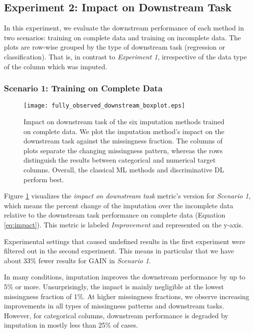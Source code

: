\subsection{Experiment 2: Impact on Downstream Task}

In this experiment, we evaluate the downstream performance of each method in two scenarios: training on complete data and training on incomplete data. The plots are row-wise grouped by the type of downstream task (regression or classification). That is, in contrast to \textit{Experiment 1}, irrespective of the data type of the column which was imputed. 


\subsubsection{Scenario 1: Training on Complete Data}

\begin{figure}\centering
	\texttt{[image: fully\_observed\_downstream\_boxplot.eps]}
	\caption[Downstream Ranks - Fully Observed]{Impact on downstream task of the six imputation methods trained on complete data. We plot the imputation method's impact on the downstream task against the missingness fraction. The columns of plots separate the changing missingness pattern, whereas the rows distinguish the results between categorical and numerical target columns. Overall, the classical ML methods and discriminative DL perform best.
    }
	\label{fig:fully_observed_downstream_boxplot}
\end{figure}

Figure \ref{fig:fully_observed_downstream_boxplot} visualizes the \textit{impact on downstream task} metric's version for \textit{Scenario 1}, which means the percent change of the imputation over the incomplete data relative to the downstream task performance on complete data (Equation \ref{eq:impact}). This metric is labeled \textit{Improvement} and represented on the y-axis.

Experimental settings that caused undefined results in the first experiment were filtered out in the second experiment. This means in particular that we have about 33\% fewer results for GAIN in \textit{Scenario 1}.

In many conditions, imputation improves the downstream performance by up to 5\% or more. Unsurprisingly, the impact is mainly negligible at the lowest missingness fraction of 1\%. At higher missingness fractions, we observe increasing improvements in all types of missingness patterns and downstream tasks. However, for categorical columns, downstream performance is degraded by imputation in mostly less than 25\% of cases.


